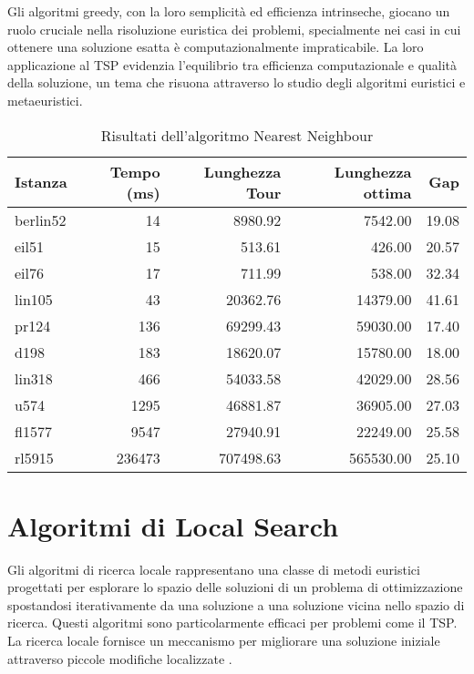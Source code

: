 Gli algoritmi greedy, con la loro semplicità ed efficienza intrinseche, giocano un ruolo cruciale nella risoluzione euristica dei problemi, specialmente nei casi in cui ottenere una soluzione esatta è computazionalmente impraticabile. La loro applicazione al \Gls{TSP} evidenzia l'equilibrio tra efficienza computazionale e qualità della soluzione, un tema che risuona attraverso lo studio degli algoritmi euristici e metaeuristici.


\begin{table}
	\centering
	\caption{Risultati dell'algoritmo Nearest Neighbour}
	\begin{tabular}{lrrrr}
		\toprule
		Istanza  & Tempo (ms) & Lunghezza Tour & Lunghezza ottima & Gap   \\
		\midrule
		berlin52 & 14         & 8980.92        & 7542.00          & 19.08 \\
		eil51    & 15         & 513.61         & 426.00           & 20.57 \\
		eil76    & 17         & 711.99         & 538.00           & 32.34 \\
		lin105   & 43         & 20362.76       & 14379.00         & 41.61 \\
		pr124    & 136        & 69299.43       & 59030.00         & 17.40 \\
		d198     & 183        & 18620.07       & 15780.00         & 18.00 \\
		lin318   & 466        & 54033.58       & 42029.00         & 28.56 \\
		u574     & 1295       & 46881.87       & 36905.00         & 27.03 \\
		fl1577   & 9547       & 27940.91       & 22249.00         & 25.58 \\
		rl5915   & 236473     & 707498.63      & 565530.00        & 25.10 \\
		\bottomrule
	\end{tabular}
\end{table}


\section{Algoritmi di Local Search}

Gli algoritmi di ricerca locale rappresentano una classe di metodi euristici progettati per esplorare lo spazio delle soluzioni di un problema di ottimizzazione spostandosi iterativamente da una soluzione a una soluzione vicina nello spazio di ricerca. Questi algoritmi sono particolarmente efficaci per problemi come il \Gls{TSP}. La ricerca locale fornisce un meccanismo per migliorare una soluzione iniziale attraverso piccole modifiche localizzate \cite{Johnson2002,Lawler1985}.

